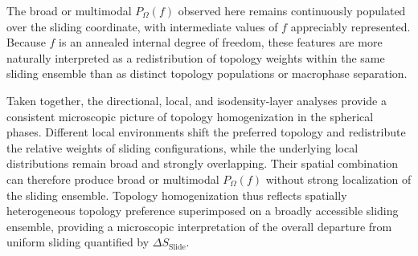 \documentclass[journal=mamobx,manuscript=article]{achemso}
\begin{document}
	
	The broad or multimodal $P_\Omega(f)$ observed here remains continuously populated over the sliding coordinate, with intermediate values of $f$ appreciably represented.
	Because $f$ is an annealed internal degree of freedom, these features are more naturally interpreted as a redistribution of topology weights within the same sliding ensemble than as distinct topology populations or macrophase separation.
	
	Taken together, the directional, local, and isodensity-layer analyses provide a consistent microscopic picture of topology homogenization in the spherical phases.
	Different local environments shift the preferred topology and redistribute the relative weights of sliding configurations, while the underlying local distributions remain broad and strongly overlapping.
	Their spatial combination can therefore produce broad or multimodal $P_\Omega(f)$ without strong localization of the sliding ensemble.
	Topology homogenization thus reflects spatially heterogeneous topology preference superimposed on a broadly accessible sliding ensemble, providing a microscopic interpretation of the overall departure from uniform sliding quantified by $\Delta S_{\mathrm{Slide}}$.


% 
% 

\end{document}

